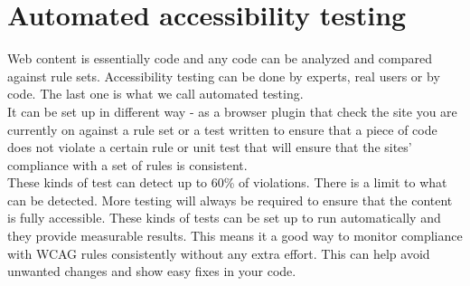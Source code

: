 \documentclass{master_thesis_section}
\begin{document}
\section{Automated accessibility testing}

Web content is essentially code and any code can be analyzed and compared against rule sets. Accessibility testing can be done by experts, real users or by code. The last one is what we call automated testing. \\
It can be set up in different way - as a browser plugin that check the site you are currently on against a rule set or a test written to ensure that a piece of code does not violate a certain rule or unit test that will ensure that the sites' compliance with a set of rules is consistent. \\
These kinds of test can detect up to 60\% of violations.
There is a limit to what can be detected. More testing will always be required to ensure that the content is fully accessible. These kinds of tests can be set up to run automatically and they provide measurable results. This means it a good way to monitor compliance with WCAG rules consistently without any extra effort. This can help avoid unwanted changes and show easy fixes in  your code.
\end{document}
